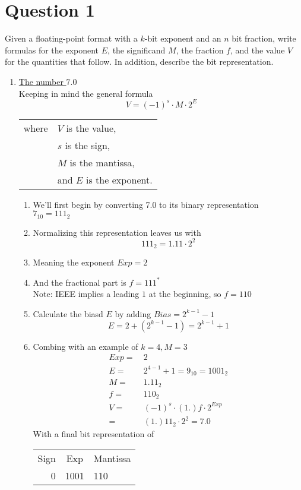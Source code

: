 \documentclass{article}
\begin{document}
\section*{Question 1}
Given a floating-point format with a \(k\)-bit exponent and an \(n\) bit fraction, write formulas for the exponent \(E\), the significand \(M\), the fraction \(f\), and the value \(V\) for the quantities that follow. In addition, describe the bit representation.

\begin{enumerate}[label=\Alph*)]
    \item \underline{The number \(7.0\)} \\[\baselineskip]
    Keeping in mind the general formula 
    \[V = (-1)^s \cdot M \cdot 2^E\]
    \begin{tabular}{rl}
        where & \(V\) is the value, \\
        & \(s\) is the sign, \\
        & \(M\) is the mantissa, \\
        & and \(E\) is the exponent. \\
    \end{tabular}

    \begin{enumerate}[label=\arabic*.]
        \item We'll first begin by converting 7.0 to its binary representation \\
        \(7_{10} = 111_2\)
        \item Normalizing this representation leaves us with
        \[111_2 = 1.11 \cdot 2^2\]
        \item Meaning the exponent \(Exp = 2\)
        \item And the fractional part is \(f = 111^*\) \\
        Note: IEEE implies a leading \(1\) at the beginning, so \(f = 110\)
        \item Calculate the biasd \(E\) by adding \(Bias = 2^{k-1} - 1\)
        \[E = 2 + (2^{k-1} - 1) = 2^{k-1} + 1\]
        \item Combing with an example of \(k = 4, M = 3\)
        \begin{align*}
            Exp =&\ 2 \\
            E =&\ 2^{4-1} + 1 = 9_{10} = 1001_2 \\
            M =&\ 1.11_2 \\
            f =&\ 110_2 \\
            V =&\ (-1)^s \cdot (1.)f \cdot 2^{Exp} \\
              =&\ (1.)11_2 \cdot 2^{2} = 7.0
        \end{align*}
        With a final bit representation of
        \begin{tabular}{r|c|l}
            Sign & Exp & Mantissa \\
            0 & 1001 & 110 \\
        \end{tabular}
    \end{enumerate}


\end{enumerate}
\end{document}
